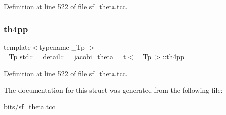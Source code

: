 Definition at line 522 of file sf\+\_\+theta.\+tcc.

\mbox{\label{structstd_1_1____detail_1_1____jacobi__theta__0__t_a1b051490c9e6c438c3edadd5d13b3810}} 
\subsubsection{\texorpdfstring{th4pp}{th4pp}}
{\footnotesize\ttfamily template$<$typename \+\_\+\+Tp $>$ \\
\+\_\+\+Tp \hyperlink{structstd_1_1____detail_1_1____jacobi__theta__0__t}{std\+::\+\_\+\+\_\+detail\+::\+\_\+\+\_\+jacobi\+\_\+theta\+\_\+\_\+t}$<$ \+\_\+\+Tp $>$\+::th4pp}



Definition at line 522 of file sf\+\_\+theta.\+tcc.



The documentation for this struct was generated from the following file\+:\begin{DoxyCompactItemize}
\item 
bits/\hyperlink{sf__theta_8tcc}{sf\+\_\+theta.\+tcc}\end{DoxyCompactItemize}
